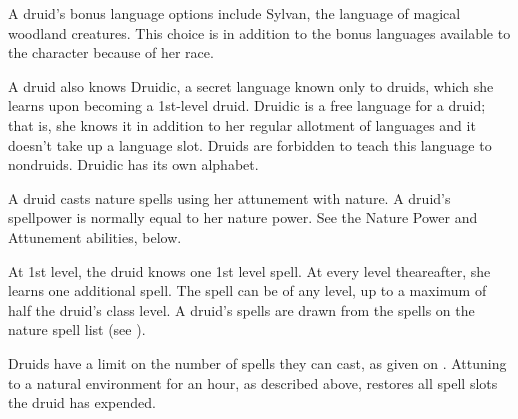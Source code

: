 A druid's bonus language options include Sylvan, the language of magical woodland creatures.
This choice is in addition to the bonus languages available to the character because of her race.

A druid also knows Druidic, a secret language known only to druids, which she learns upon becoming a 1st-level druid.
Druidic is a free language for a druid; that is, she knows it in addition to her regular allotment of languages and it doesn't take up a language slot.
Druids are forbidden to teach this language to nondruids.
Druidic has its own alphabet.

A druid casts nature spells using her attunement with nature.
A druid's spellpower is normally equal to her nature power.
See the Nature Power and Attunement abilities, below.

At 1st level, the druid knows one 1st level spell.
At every level theareafter, she learns one additional spell.
The spell can be of any level, up to a maximum of half the druid's class level.
A druid's spells are drawn from the spells on the nature spell list (see ).

Druids have a limit on the number of spells they can cast, as given on .
Attuning to a natural environment for an hour, as described above, restores all spell slots the druid has expended.

